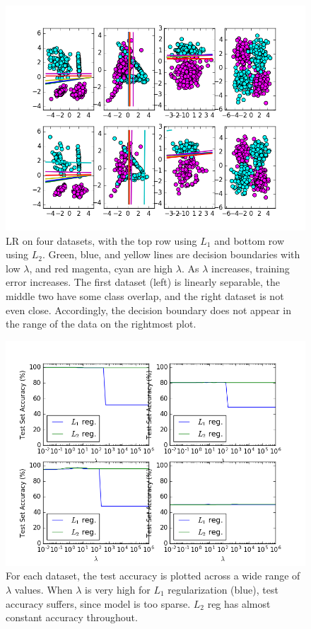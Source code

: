 \begin{figure}
	\centering
	\includegraphics [trim=0 0 0 0, clip, angle=0, width=0.8\columnwidth,
	keepaspectratio]{figures/1_2_decisions}
	\caption{LR on four datasets, with the top row using $L_1$ and bottom row using $L_2$. Green, blue, and yellow lines are decision boundaries with low $\lambda$, and red magenta, cyan are high $\lambda$. As $\lambda$ increases, training error increases. The first dataset (left) is linearly separable, the middle two have some class overlap, and the right dataset is not even close. Accordingly, the decision boundary does not appear in the range of the data on the rightmost plot.} 
	\label{fig:1_2_decisions} 
\end{figure}

\begin{figure}
	\centering
	\includegraphics [trim=0 0 0 0, clip, angle=0, width=0.8\columnwidth,
	keepaspectratio]{figures/1_2_accuracy}
	\caption{For each dataset, the test accuracy is plotted across a wide range of $\lambda$ values. When $\lambda$ is very high for $L_1$ regularization (blue), test accuracy suffers, since model is too sparse. $L_2$ reg has almost constant accuracy throughout.} 
	\label{fig:1_2_accuracy} 
\end{figure}

